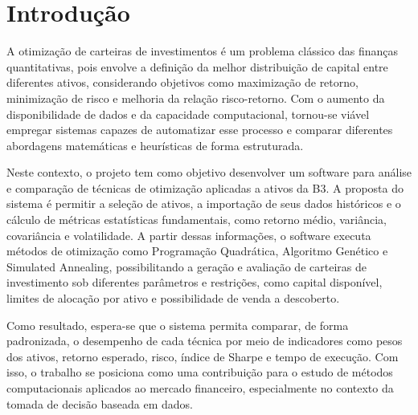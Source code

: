 \documentclass[
	12pt,				%
	openright,			%
	oneside,			    %
	a4paper,				%
	english,			%
	french,			%
	spanish,			%
	brazil			%
	]{abntex2}
\begin{document}

\frenchspacing 


\imprimircapa

\tableofcontents*
\cleardoublepage



\textual


\chapter{Introdução}

A otimização de carteiras de investimentos é um problema clássico das finanças quantitativas, pois envolve a definição da melhor distribuição de capital entre diferentes ativos, considerando objetivos como maximização de retorno, minimização de risco e melhoria da relação risco-retorno. Com o aumento da disponibilidade de dados e da capacidade computacional, tornou-se viável empregar sistemas capazes de automatizar esse processo e comparar diferentes abordagens matemáticas e heurísticas de forma estruturada.

Neste contexto, o projeto tem como objetivo desenvolver um software para análise e comparação de técnicas de otimização aplicadas a ativos da B3. A proposta do sistema é permitir a seleção de ativos, a importação de seus dados históricos e o cálculo de métricas estatísticas fundamentais, como retorno médio, variância, covariância e volatilidade. A partir dessas informações, o software executa métodos de otimização como Programação Quadrática, Algoritmo Genético e Simulated Annealing, possibilitando a geração e avaliação de carteiras de investimento sob diferentes parâmetros e restrições, como capital disponível, limites de alocação por ativo e possibilidade de venda a descoberto.

Como resultado, espera-se que o sistema permita comparar, de forma padronizada, o desempenho de cada técnica por meio de indicadores como pesos dos ativos, retorno esperado, risco, índice de Sharpe e tempo de execução. Com isso, o trabalho se posiciona como uma contribuição para o estudo de métodos computacionais aplicados ao mercado financeiro, especialmente no contexto da tomada de decisão baseada em dados.
\end{document}
